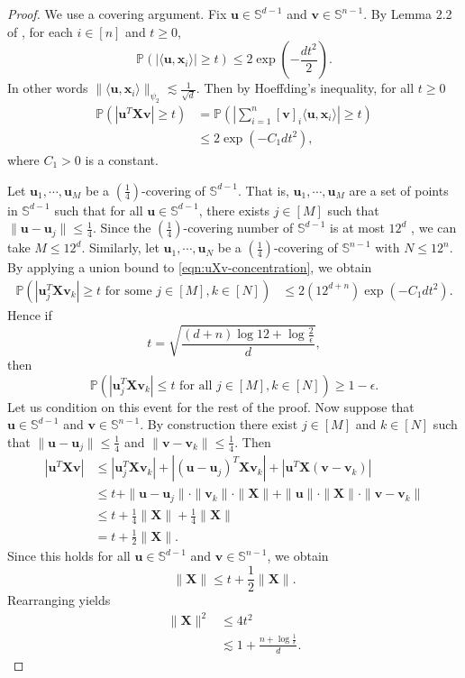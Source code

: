 \documentclass{article}
\theoremstyle{definition}
\renewcommand{\P}{\mathbb{P}}
\renewcommand{\S}{\mathbb{S}}
\def\vu{{\bm{u}}}
\def\vv{{\bm{v}}}
\def\vx{{\bm{x}}}
\def\mX{{\bm{X}}}
\begin{document}
\begin{proof}
    We use a covering argument. Fix $\vu \in \S^{d-1}$ and $\vv \in \S^{n - 1}$. By Lemma 2.2 of \cite{ball1997elementary}, for each $i \in [n]$ and $t \geq 0$,
    \[\P(|\langle \vu, \vx_i \rangle| \geq t) \leq 2\exp\left(-\frac{dt^2}{2}\right).\]
    In other words $\|\langle \vu, \vx_i \rangle\|_{\psi_2} \lesssim \frac{1}{\sqrt{d}}$. Then by Hoeffding's inequality, for all $t \geq 0$
    \begin{align}
        \P(|\vu^T\mX \vv|\geq t) &= \P\left(\left|\sum_{i = 1}^n [\vv]_i \langle \vu, \vx_i \rangle\right| \geq t \right)\nonumber\\
        &\leq 2\exp\left(-C_1 dt^2 \right)\label{eqn:uXv-concentration},
    \end{align}
    where $C_1 > 0$ is a constant.

    Let $\vu_1, \cdots, \vu_M$ be a $\left(\frac{1}{4}\right)$-covering of $\S^{d - 1}$. That is, $\vu_1, \cdots, \vu_M$ are a set of points in $\S^{d - 1}$ such that for all $\vu \in \S^{d - 1}$, there exists $j \in [M]$ such that $\|\vu - \vu_j\| \leq \frac{1}{4}$. Since the $\left(\frac{1}{4}\right)$-covering number of $\S^{d - 1}$ is at most $12^d$ \citep[see][Corollary 4.2.13]{vershynin2018high}, we can take $M \leq 12^d$. Similarly, let $\vu_1, \cdots, \vu_N$ be a $\left(\frac{1}{4}\right)$-covering of $\S^{n - 1}$ with $N \leq 12^n$. By applying a union bound to \eqref{eqn:uXv-concentration}, we obtain 
    \begin{align*}
        \P(|\vu_j^T \mX \vv_k| \geq t \text{ for some $j \in [M], k \in [N]$}) &\leq 2(12^{d + n})\exp\left(-C_1 d t^2\right).
    \end{align*}
    Hence if
    \[
    t = \sqrt{\frac{(d + n)\log 12 + \log \frac{2}{\epsilon}}{d} } , 
    \]
    then
    \[\P(|\vu_j^T \mX \vv_k| \leq t \text{ for all $j \in [M], k \in [N]$}) \geq 1 -\epsilon. \]
    Let us condition on this event for the rest of the proof. Now suppose that $\vu \in \S^{d - 1}$ and $\vv \in \S^{n - 1}$. By construction there exist $j \in [M]$ and $k \in [N]$ such that $\|\vu - \vu_j\| \leq \frac{1}{4}$ and $\|\vv - \vv_k\| \leq \frac{1}{4}$. Then
    \begin{align*}
        |\vu^T \mX \vv| &\leq |\vu_j^T \mX \vv_k| + |(\vu - \vu_j)^T\mX \vv_k| + |\vu^T \mX(\vv - \vv_k)|\\
        &\leq t + \|\vu - \vu_j\| \cdot \|\vv_k\| \cdot \|\mX\| + \|\vu\| \cdot \|\mX\| \cdot \|\vv - \vv_k\|\\
        &\leq t + \frac{1}{4}\|\mX\| + \frac{1}{4}\|\mX\|\\
        &= t + \frac{1}{2}\|\mX\|.
    \end{align*}
    Since this holds for all $\vu \in \S^{d - 1}$ and $\vv \in \S^{n - 1}$, we obtain
    \[\|\mX\| \leq t + \frac{1}{2}\|\mX\|. \]
    Rearranging yields
    \begin{align*}
        \|\mX\|^2 &\leq 4t^2\\
        &\lesssim 1 + \frac{n + \log \frac{1}{\epsilon} }{d}.
    \end{align*}
\end{proof}
\end{document}
